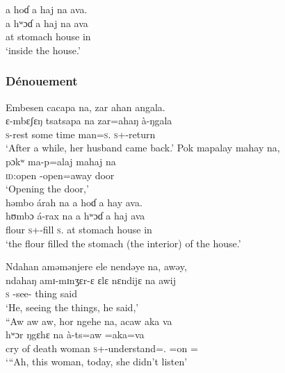 \medskip
  a  hoɗ  a  haj  na  ava.\\
 \gll a    hʷɔɗ  a  haj  na  ava\\
 at    stomach  {\GEN}   house   {\PSP}    in\\
 \glt ‘inside the house.’
 \z
 \subsubsection*{Dénouement}
 \ea Embesen  cacapa  na,  zar  ahan  angala.\\
 \gll ɛ{}-mbɛʃɛŋ    tsatsapa na    zar=ahaŋ         à-ŋgala\\
 \textsc{s}-rest      {some time}     {\PSP}  man=\textsc{s}.{\POSS}  \textsc{s}+{\PFV}-return\\
 \glt ‘After a while, her husband came back.’
 \z
 \ea  Pok  mapalay  mahay  na,\\
 \gll pɔkʷ ma-p=alaj  mahaj na\\
 \textsc{id}:open  {\NOM}{}-open=away  door   {\PSP}\\
 \glt ‘Opening the door,'\\
 
 \medskip
  həmbo  árah  na  a  hoɗ  a  hay  ava.\\
 \gll hʊmbɔ  á-rax           na      a     hʷɔɗ       a        haj     ava\\
 flour     \textsc{s}+{\IFV}-fill   \textsc{s}.{\DO}   at   stomach  {\GEN}   house     in\\
 \glt ‘the flour filled the stomach (the interior) of the house.’\\
 \z
 
 \ea  Ndahan  aməmənjere   ele  nendəye  na,  awəy,\\
 \gll ndahaŋ  amɪ-mɪnʒɛr{}-ɛ   ɛlɛ    nɛndijɛ  na awij\\
 \textsc{s}           {\DEP}-see-{\CL}        thing     {\DEM}   {\PSP}  said\\
 \glt ‘He, seeing the things, he said,’\\
 
 \medskip
 “Aw  aw  aw,  hor  ngehe  na,  acaw  aka  va  \\
   hʷɔr      ŋgɛhɛ    na  à-ts=aw   =aka=va\\
 {cry of death}  woman  {\DEM}      {\PSP}  \textsc{s}+{\PFV}-understand={\oneS}.{\IO}  =on    ={\PRF}\\
 \glt ‘“Ah, this woman, today, she didn’t listen’\\
 
